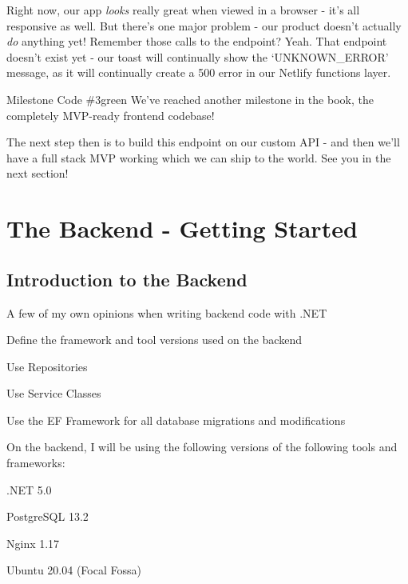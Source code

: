 \documentclass[paper=6in:9in,pagesize=pdftex,headinclude=on,footinclude=on,12pt,twoside]{scrbook}
\begin{document}
Right now, our app \textit{looks} really great when viewed in a browser - it's all responsive as well. But there's one major problem - our product doesn't actually \textit{do} anything yet! \joy Remember those calls to the  endpoint? Yeah. That endpoint doesn't exist yet - our toast will continually show the `UNKNOWN\_ERROR' message, as it will continually create a 500 error in our Netlify functions layer.

\begin{highlightBox}{Milestone Code \#3}{green}{\greenCheck}
We've reached another milestone in the book, the completely MVP-ready frontend codebase!
\end{highlightBox}

The next step then is to build this  endpoint on our custom API - and then we'll have a full stack MVP working which we can ship to the world. See you in the next section!

\chapter{The Backend - Getting Started}

\section{Introduction to the Backend}
\begin{arrows}
\item A few of my own opinions when writing backend code with .NET
\item Define the framework and tool versions used on the backend
\end{arrows}


\begin{arrows}
\item Use Repositories 
\item Use Service Classes
\item Use the EF Framework for all database migrations and modifications
\end{arrows}


On the backend, I will be using the following versions of the following tools and frameworks:

\begin{arrows}
\item .NET 5.0
\item PostgreSQL 13.2
\item Nginx 1.17
\item Ubuntu 20.04 (Focal Fossa)
\end{arrows}
\end{document}
